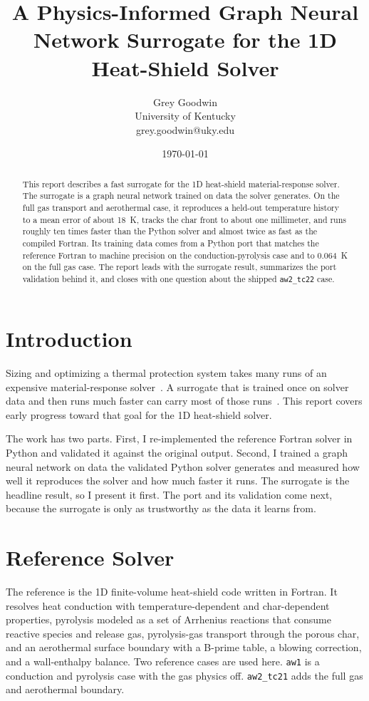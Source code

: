 \documentclass[11pt]{article}
\title{A Physics-Informed Graph Neural Network Surrogate for the 1D
Heat-Shield Solver}
\author{Grey Goodwin \\ University of Kentucky \\ grey.goodwin@uky.edu}
\date{\today}
\begin{document}
\maketitle

\begin{abstract}
This report describes a fast surrogate for the 1D heat-shield material-response
solver. The surrogate is a graph neural network trained on data the solver
generates. On the full gas transport and aerothermal case, it reproduces a held-out
temperature history to a mean error of about 18~K, tracks the char front to
about one millimeter, and runs roughly ten times faster than the Python solver and
almost twice as fast as the compiled Fortran. Its training data comes from a Python port that matches the reference Fortran to
machine precision on the conduction-pyrolysis case and to 0.064~K on the full gas
case. The report leads with the surrogate result, summarizes the port validation
behind it, and closes with one question about the shipped \texttt{aw2\_tc22} case.
\end{abstract}

\section{Introduction}
Sizing and optimizing a thermal protection system takes many runs of an expensive
material-response solver~\cite{lu2024}. A surrogate that is trained once on solver
data and then runs much faster can carry most of those runs~\cite{queipo2005,pan2023}. This report covers early progress
toward that goal for the 1D heat-shield solver.

The work has two parts. First, I re-implemented the reference Fortran solver in
Python and validated it against the original output. Second, I trained a graph
neural network on data the validated Python solver generates and measured how well
it reproduces the solver and how much faster it runs. The surrogate is the headline
result, so I present it first. The port and its validation come next, because the
surrogate is only as trustworthy as the data it learns from.

\section{Reference Solver}
The reference is the 1D finite-volume heat-shield code written in Fortran. It
resolves heat conduction with temperature-dependent and char-dependent properties,
pyrolysis modeled as a set of Arrhenius reactions that consume reactive species and
release gas, pyrolysis-gas transport through the porous char, and an aerothermal
surface boundary with a B-prime table, a blowing correction, and a wall-enthalpy
balance. Two reference cases are used here. \texttt{aw1} is a conduction and
pyrolysis case with the gas physics off. \texttt{aw2\_tc21} adds the full gas and
aerothermal boundary.
\end{document}
